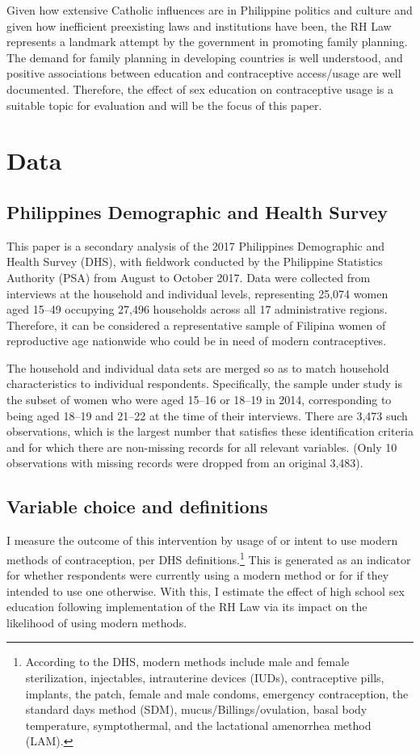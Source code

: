 \documentclass[12pt]{article}
\begin{document}
    Given how extensive Catholic influences are in Philippine politics and culture and given how inefficient preexisting laws and institutions have been, the RH Law represents a landmark attempt by the government in promoting family planning.
    The demand for family planning in developing countries is well understood, and positive associations between education and contraceptive access/usage are well documented.
    Therefore, the effect of sex education on contraceptive usage is a suitable topic for evaluation and will be the focus of this paper.


\section{Data}
    \subsection{Philippines Demographic and Health Survey}
    This paper is a secondary analysis of the 2017 Philippines Demographic and Health Survey (DHS), with fieldwork conducted by the Philippine Statistics Authority (PSA) from August to October 2017.
    Data were collected from interviews at the household and individual levels, representing 25,074 women aged 15--49 occupying 27,496 households across all 17 administrative regions.
    Therefore, it can be considered a representative sample of Filipina women of reproductive age nationwide who could be in need of modern
    contraceptives.

    The household and individual data sets are merged so as to match household characteristics to individual respondents.
    Specifically, the sample under study is the subset of women who were aged 15--16 or 18--19 in 2014, corresponding to being aged 18--19 and 21--22 at the time of their interviews.
    There are 3,473 such observations, which is the largest number that satisfies these identification criteria and for which there are non-missing records for all relevant variables.
    (Only 10 observations with missing records were dropped from an original 3,483).


    \subsection{Variable choice and definitions}
    I measure the outcome of this intervention by usage of or intent to use modern methods of contraception, per
    DHS definitions.\footnote{
        According to the DHS, modern methods include male and female sterilization, injectables, intrauterine devices (IUDs), contraceptive pills, implants, the patch, female and male condoms, emergency contraception, the standard days method (SDM), mucus/Billings/ovulation, basal body temperature, symptothermal, and the lactational amenorrhea method (LAM).
    }
    This is generated as an indicator for whether respondents were currently using a modern method or for if they intended to use one otherwise.
    With this, I estimate the effect of high school sex education following implementation of the RH Law via its impact on the likelihood of using modern methods.
\end{document}
